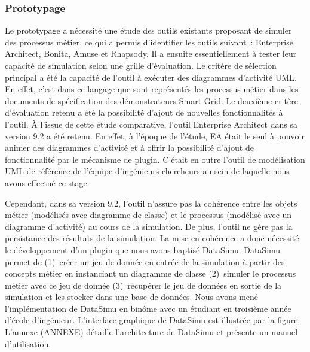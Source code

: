 			\subsubsection{Prototypage}
				Le prototypage a nécessité une étude des outils existants proposant de simuler des processus métier, ce qui a permis d'identifier les outils suivant~: Enterprise Architect, Bonita, Amuse et Rhapsody. Il a ensuite essentiellement à tester leur capacité de simulation selon une grille d'évaluation. Le critère de sélection principal a été la capacité de l'outil à exécuter des diagrammes d'activité UML. En effet, c'est dans ce langage que sont représentés les processus métier dans les documents de spécification des démonstrateurs Smart Grid. Le deuxième critère d'évaluation retenu a été la possibilité d'ajout de nouvelles fonctionnalités à l'outil. À l'issue de cette étude comparative, l'outil Enterprise Architect dans sa version 9.2 a été retenu. En effet, à l'époque de l'étude, EA était le seul à pouvoir animer des diagrammes d'activité et à offrir la possibilité d'ajout de fonctionnalité par le mécanisme de plugin. C'était en outre l'outil de modélisation UML de référence de l'équipe d'ingénieurs-chercheurs au sein de laquelle nous avons effectué ce stage.
				
				Cependant, dans sa version 9.2, l'outil n'assure pas la cohérence entre les objets métier (modélisés avec diagramme de classe) et le processus (modélisé avec un diagramme d'activité) au cours de la simulation. De plus, l'outil ne gère pas la persistance des résultats de la simulation. La mise en cohérence a donc nécessité le développement d'un plugin que nous avons baptisé DataSimu. DataSimu permet de (1)~créer un jeu de donnée en entrée de la simulation à partir des concepts métier en instanciant un diagramme de classe (2)~simuler le processus métier avec ce jeu de donnée (3)~récupérer le jeu de données en sortie de la simulation et les stocker dans une base de données. Nous avons mené l'implémentation de DataSimu en binôme avec un étudiant en troisième année d'école d'ingénieur. L'interface graphique de DataSimu est illustrée par la figure. L'annexe (ANNEXE) détaille l'architecture de DataSimu et présente un manuel d'utilisation. 
				

